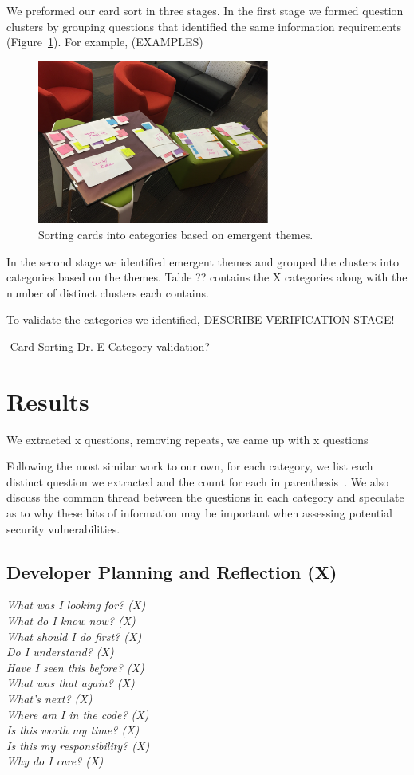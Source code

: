 \documentclass[conference]{IEEEtran}
\begin{document}
We preformed our card sort in three stages. 
In the first stage we formed question clusters by grouping questions that identified the same information requirements (Figure~\ref{fig:cardsort}). 
For example, (EXAMPLES)

\begin{figure}
\centering
\includegraphics[width=3in]{Images/categories.pdf}
\caption{Sorting cards into categories based on emergent themes.}
\label{fig:cardsort} 
\end{figure}

In the second stage we identified emergent themes and grouped the clusters into categories based on the themes. 
Table ?? contains the X categories along with the number of distinct clusters each contains.

To validate the categories we identified, DESCRIBE VERIFICATION STAGE! 

-Card Sorting
Dr. E Category validation?


\section{Results}
\label{sec:results}
We extracted x questions, removing repeats, we came up with x questions

Following the most similar work to our own, for each category, we list each distinct question we extracted and the count for each in parenthesis~\cite{latoza2010hard}. We also discuss the common thread between the questions in each category and speculate as to why these bits of information may be important when assessing potential security vulnerabilities.

\noindent\subsection{\textbf{Developer Planning and Reflection (X)}} 

\noindent\emph{What was I looking for? (X)} \\
\emph{What do I know now? (X)} \\
\emph{What should I do first? (X)} \\
\emph{Do I understand? (X)} \\
\emph{Have I seen this before? (X)} \\
\emph{What was that again? (X)} \\
\emph{What's next? (X)} \\
\emph{Where am I in the code? (X)} \\
\emph{Is this worth my time? (X)} \\
\emph{Is this my responsibility? (X)} \\
\emph{Why do I care? (X)} \\
\end{document}
